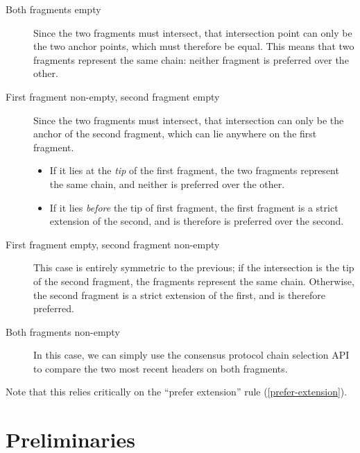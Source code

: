 \begin{description}

\item[Both fragments empty]
Since the two fragments must intersect, that intersection point can only
be the two anchor points, which must therefore be equal. This means that
two fragments represent the same chain: neither fragment is preferred
over the other.

\item[First fragment non-empty, second fragment empty]
Since the two fragments must intersect, that intersection can only be the
anchor of the second fragment, which can lie anywhere on the first fragment.

\begin{itemize}
\item If it lies at the \emph{tip} of the first fragment, the two fragments represent the
same chain, and neither is preferred over the other.
\item If it lies \emph{before} the tip of first fragment, the first fragment is
a strict extension of the second, and is therefore is preferred over the
second.
\end{itemize}

\item[First fragment empty, second fragment non-empty]
This case is entirely symmetric to the previous; if the intersection is the
tip of the second fragment, the fragments represent the same chain. Otherwise,
the second fragment is a strict extension of the first, and is therefore
preferred.

\item[Both fragments non-empty]
In this case, we can simply use the consensus protocol chain selection API
to compare the two most recent headers on both fragments.

\end{description}

Note that this relies critically on the ``prefer extension'' rule
(\cref{prefer-extension}).

\section{Preliminaries}
\label{chainsel:spec}

